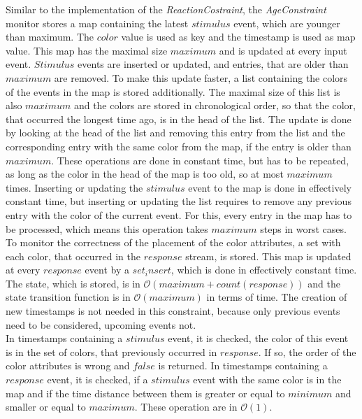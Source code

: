 	Similar to the implementation of the \emph{ReactionCostraint}, the \emph{AgeConstraint} monitor stores a map containing the latest $stimulus$ event, which are younger than maximum. The $color$ value is used as key and the timestamp is used as map value. This map has the maximal size $maximum$ and is updated at every input event. $Stimulus$ events are inserted or updated, and entries, that are older than $maximum$ are removed. To make this update faster, a list containing the colors of the events in the map is stored additionally. The maximal size of this list is also $maximum$ and the colors are stored in chronological order, so that the color, that occurred the longest time ago, is in the head of the list. The update is done by looking at the head of the list and removing this entry from the list and the corresponding entry with the same color from the map, if the entry is older than $maximum$. These operations are done in constant time, but has to be repeated, as long as the color in the head of the map is too old, so at most $maximum$ times. Inserting or updating the $stimulus$ event to the map is done in effectively constant time, but inserting or updating the list requires to remove any previous entry with the color of the current event. For this, every entry in the map has to be processed, which means this operation takes $maximum$ steps in worst cases.\\
	To monitor the correctness of the placement of the color attributes, a set with each color, that occurred in the $response$ stream, is stored. This map is updated at every $response$ event by a $set_insert$, which is done in effectively constant time. The state, which is stored, is in $\mathcal{O}(maximum+count(response))$ and the state transition function is in $\mathcal{O}(maximum)$ in terms of time. The creation of new timestamps is not needed in this constraint, because only previous events need to be considered, upcoming events not.\\
	In timestamps containing a $stimulus$ event, it is checked,  the color of this event is in the set of colors, that previously occurred in $response$. If so, the order of the color attributes is wrong and $false$ is returned. In timestamps containing a $response$ event, it is checked, if a $stimulus$ event with the same color is in the map and if the time distance between them is greater or equal to $minimum$ and smaller or equal to $maximum$. These operation are in $\mathcal{O}(1)$.

